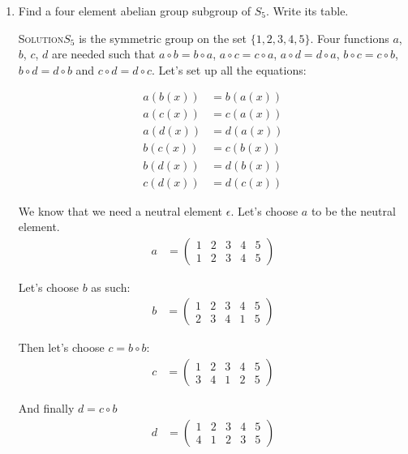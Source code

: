 \documentclass[twoside]{amsart}
\newcommand{\solution}{\textsc{Solution}\xspace}
\begin{document}
\begin{enumerate}[A.]
\begin{enumerate}[1]
      \item Find a four element abelian group subgroup of $S_5$. Write
      its table. 
      
      \solution $S_5$ is the symmetric group on the set  $\{1,2,3,4,5\}$.  Four
      functions $a$, $b$, $c$, $d$ are needed such that $a \circ b = b \circ
      a$, $a \circ c=c \circ a$, $a \circ d=d \circ a$, $b \circ c=c \circ b$,
      $b \circ d=d \circ b$ and $c \circ d=d \circ c$. Let's set up
      all the equations:

      \begin{align*}
         a(b(x)) & = b(a(x)) \\
	 a(c(x)) & = c(a(x)) \\
	 a(d(x)) & = d(a(x)) \\
	 b(c(x)) & = c(b(x)) \\
	 b(d(x)) & = d(b(x)) \\
	 c(d(x)) & = d(c(x)) 
      \end{align*}

      We know that we need a neutral element $\epsilon$. Let's choose
      $a$ to be the neutral element.
      \begin{align*}
         a & = \begin{pmatrix}
	          1 & 2 & 3 & 4 & 5 \\
		  1 & 2 & 3 & 4 & 5
	       \end{pmatrix}
      \end{align*}

      Let's choose $b$ as such:
      \begin{align*}
         b & = \begin{pmatrix}
	          1 & 2 & 3 & 4 & 5 \\
		  2 & 3 & 4 & 1 & 5
	       \end{pmatrix}
      \end{align*}

      Then let's choose $c= b \circ b$:
      \begin{align*}
         c & = \begin{pmatrix}
	          1 & 2 & 3 & 4 & 5 \\
		  3 & 4 & 1 & 2 & 5
	       \end{pmatrix}
      \end{align*}

      And finally $d = c \circ b$
      \begin{align*}
         d & = \begin{pmatrix}
	          1 & 2 & 3 & 4 & 5 \\
		  4 & 1 & 2 & 3 & 5
	       \end{pmatrix}
      \end{align*}


\end{enumerate}
\end{enumerate}
\end{document}
